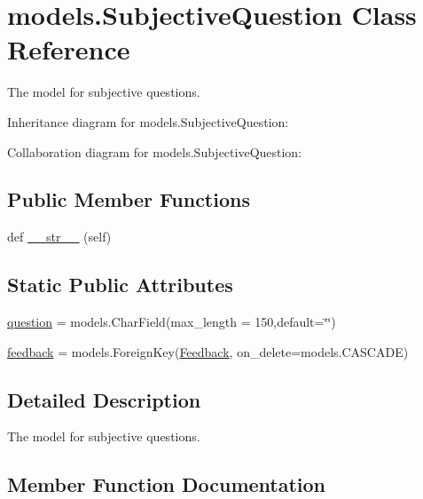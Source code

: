 \hypertarget{classmodels_1_1_subjective_question}{}\section{models.\+Subjective\+Question Class Reference}
\label{classmodels_1_1_subjective_question}


The model for subjective questions.  




Inheritance diagram for models.\+Subjective\+Question\+:


Collaboration diagram for models.\+Subjective\+Question\+:
\subsection*{Public Member Functions}
\begin{DoxyCompactItemize}
\item 
def \hyperlink{classmodels_1_1_subjective_question_a4c6bab4f4d053ed80705d495d9961ee9}{\+\_\+\+\_\+str\+\_\+\+\_\+} (self)
\end{DoxyCompactItemize}
\subsection*{Static Public Attributes}
\begin{DoxyCompactItemize}
\item 
\hyperlink{classmodels_1_1_subjective_question_a77c12089f4f2382cadb7f4d3ab7d6027}{question} = models.\+Char\+Field(max\+\_\+length = 150,default=\char`\"{}\char`\"{})
\item 
\hyperlink{classmodels_1_1_subjective_question_ab8bdc65e739da2d690b1353a5310deba}{feedback} = models.\+Foreign\+Key(\hyperlink{classmodels_1_1_feedback}{Feedback}, on\+\_\+delete=models.\+C\+A\+S\+C\+A\+DE)
\end{DoxyCompactItemize}


\subsection{Detailed Description}
The model for subjective questions. 

\subsection{Member Function Documentation}
